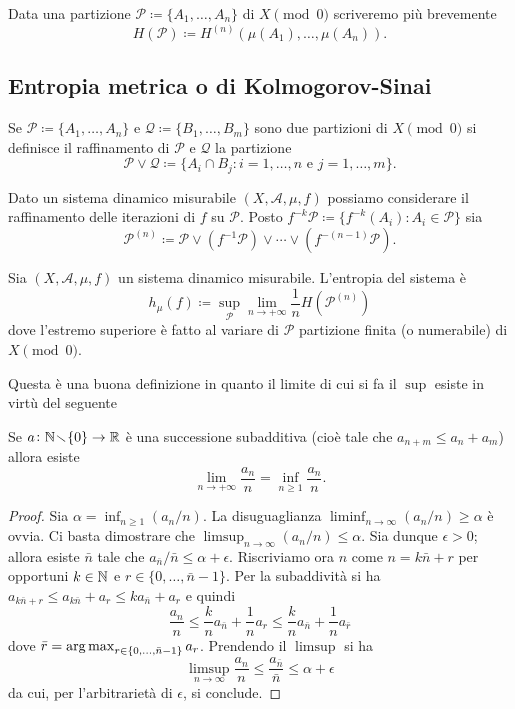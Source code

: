 Data una partizione $ \mathcal{P} \coloneqq \{A_1, \ldots, A_n\} $ di $ X \pmod{0} $ scriveremo più brevemente
\[ H(\mathcal{P}) \coloneqq H^{(n)}(\mu(A_1), \ldots, \mu(A_n)). \]

\subsection{Entropia metrica o di Kolmogorov-Sinai}

\begin{definition}
    Se $ \mathcal{P} \coloneqq \{A_1, \ldots, A_n\} $ e $ \mathcal{Q} \coloneqq \{B_1, \ldots, B_m\} $ sono due partizioni di $ X \pmod{0} $ si definisce il raffinamento di $ \mathcal{P} $ e $ \mathcal{Q} $ la partizione
    \[
        \mathcal{P} \vee \mathcal{Q} \coloneqq \{A_i \cap B_j : i = 1, \ldots, n \text{ e } j = 1, \ldots, m\}.
    \]
\end{definition}

Dato un sistema dinamico misurabile $ (X, \mathcal{A}, \mu, f) $ possiamo considerare il raffinamento delle iterazioni di $ f $ su $ \mathcal{P} $. Posto $ f^{-k}\mathcal{P} \coloneqq \{f^{-k}(A_i) : A_i \in \mathcal{P}\} $ sia
\[
    \mathcal{P}^{(n)} \coloneqq \mathcal{P} \vee (f^{-1}\mathcal{P}) \vee \cdots \vee (f^{-(n-1)}\mathcal{P}).
\]

\begin{definition}
    Sia $ (X, \mathcal{A}, \mu, f) $ un sistema dinamico misurabile. L'entropia del sistema è
    \[
        h_\mu(f) \coloneqq \sup_\mathcal{P} {\lim_{n \to +\infty} \frac{1}{n}H(\mathcal{P}^{(n)})}
    \]
    dove l'estremo superiore è fatto al variare di $ \mathcal{P} $ partizione finita (o numerabile) di $ X \pmod{0} $.
\end{definition}
Questa è una buona definizione in quanto il limite di cui si fa il $ \sup $ esiste in virtù del seguente
\begin{lemma}[Fekete] \label{lem:fekete}
    Se $ a \colon \mathbb{N}\!\smallsetminus\!\{0\} \to \mathbb{R} $ è una successione subadditiva (cioè tale che $ a_{n+m} \leq a_n + a_m $) allora esiste
    \[
        \lim_{n\to+\infty} \frac{a_n}{n} = \inf_{n\geq1}\frac{a_n}{n}.
    \]
\end{lemma}
\begin{proof}
    Sia $ \alpha = \inf_{n\geq1} (a_n/n) $. La disuguaglianza $ \liminf_{n\to\infty} (a_n/n) \geq \alpha $ è ovvia. Ci basta dimostrare che $ \limsup_{n\to\infty} (a_n/n) \leq \alpha $. Sia dunque $ \epsilon > 0 $; allora esiste $ \bar{n} $ tale che $ a_{\bar{n}}/\bar{n} \leq \alpha + \epsilon $. Riscriviamo ora $ n $ come $ n = k \bar{n} + r $ per opportuni $ k\in\mathbb{N} $ e $ r\in\{0,\ldots, \bar{n}-1\} $. Per la subaddività si ha $ a_{k\bar{n}+r} \leq a_{k\bar{n}} + a_r \leq ka_{\bar{n}} + a_r $ e quindi
    \[ \frac{a_n}{n} \leq \frac{k}{n}a_{\bar{n}} + \frac{1}{n}a_r \leq \frac{k}{n}a_{\bar{n}} + \frac{1}{n} a_{\bar{r}} \]
    dove $ \bar{r} = \operatorname*{arg\, max}_{r\in\{ 0,\ldots, \bar{n}-1 \}} a_r $. Prendendo il $ \limsup $ si ha
    \[ \limsup_{n\to\infty} \frac{a_n}{n} \leq \frac{a_{\bar{n}}}{\bar{n}} \leq \alpha + \epsilon \]
    da cui, per l'arbitrarietà di $ \epsilon $, si conclude.
\end{proof}

